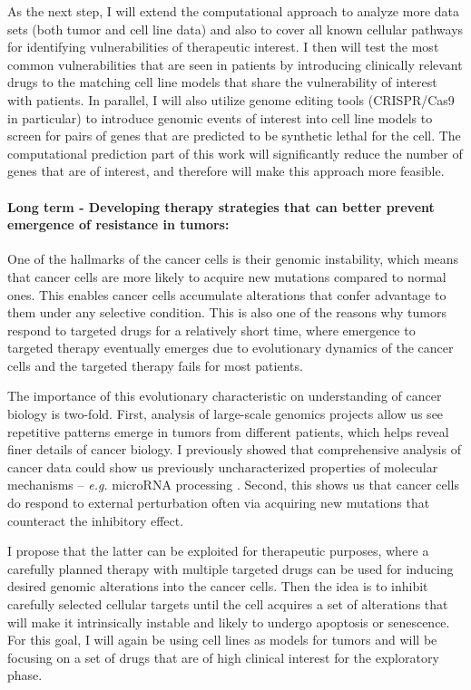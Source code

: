 \documentclass[11pt,letterpaper]{article}
\begin{document}
As the next step, I will extend the computational approach to analyze more data sets (both tumor and cell line data) and also to cover all known cellular pathways for identifying vulnerabilities of therapeutic interest.
I then will test the most common vulnerabilities that are seen in patients by introducing clinically relevant drugs to the matching cell line models that share the vulnerability of interest with patients.
In parallel, I will also utilize genome editing tools (CRISPR/Cas9 in particular)
to introduce genomic events of interest into cell line models to screen for pairs of genes that are predicted to be synthetic lethal for the cell.
The computational prediction part of this work will significantly reduce the number of genes that are of interest,
and therefore will make this approach more feasible.

\paragraph{Long term - Developing therapy strategies that can better prevent emergence of resistance in tumors:}
One of the hallmarks of the cancer cells is their genomic instability, 
which means that cancer cells are more likely to acquire new mutations compared to normal ones.
This enables cancer cells accumulate alterations that confer advantage to them under any selective condition.
This is also one of the reasons why tumors respond to targeted drugs for a relatively short time,
where emergence to targeted therapy eventually emerges due to evolutionary dynamics of the cancer cells
and the targeted therapy fails for most patients.

The importance of this evolutionary characteristic on understanding of cancer biology is two-fold.
First, analysis of large-scale genomics projects allow us see repetitive patterns emerge in tumors from different patients, which helps reveal finer details of cancer biology.
I previously showed that comprehensive analysis of cancer data could show us previously uncharacterized properties of molecular mechanisms -- \textit{e.g.} microRNA processing \cite{aksoy2014cancer}.
Second, this shows us that cancer cells do respond to external perturbation often via acquiring new mutations that counteract the inhibitory effect.

I propose that the latter can be exploited for therapeutic purposes,
where a carefully planned therapy with multiple targeted drugs can be used for inducing desired genomic alterations into the cancer cells.
Then the idea is to inhibit carefully selected cellular targets until the cell acquires a set of alterations that will make it intrinsically instable and likely to undergo apoptosis or senescence.
For this goal, I will again be using cell lines as models for tumors
and will be focusing on a set of drugs that are of high clinical interest for the exploratory phase.

\clearpage

\footnotesize{
{}
}
\end{document}
